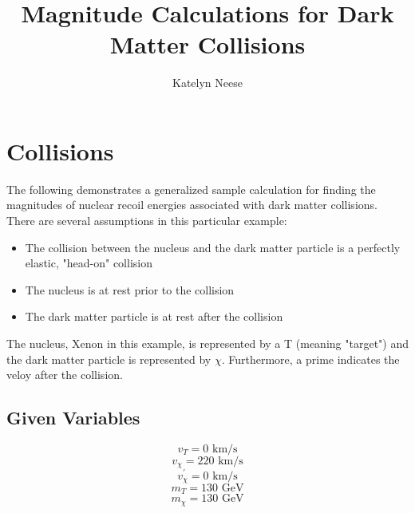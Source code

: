 \documentclass{article}
\begin{document}
\author{Katelyn Neese}
\title{Magnitude Calculations for Dark Matter Collisions}
\maketitle


\section{Collisions}       
The following demonstrates a generalized sample calculation for finding the magnitudes of nuclear recoil energies associated with dark matter collisions. There are several assumptions in this particular example:

\begin{itemize}
\item The collision between the nucleus and the dark matter particle is a perfectly elastic, "head-on" collision
\item The nucleus is at rest prior to the collision
\item  The dark matter particle is at rest after the collision 
\end{itemize}

The nucleus, Xenon in this example, is represented by a T (meaning "target") and the dark matter particle is represented by \( \chi \). Furthermore, a prime indicates the veloy after the collision. 

\subsection{Given Variables}

$$v_{T} = 0 \textrm{ km/s}$$
$$v_{\chi } = 220 \textrm{ km/s}$$
$$v^{\prime}_{\chi } = 0 \textrm{ km/s}$$
$$m_{T} = 130 \textrm{ GeV} $$
$$m_{\chi} = 130 \textrm{ GeV} $$
\end{document}
